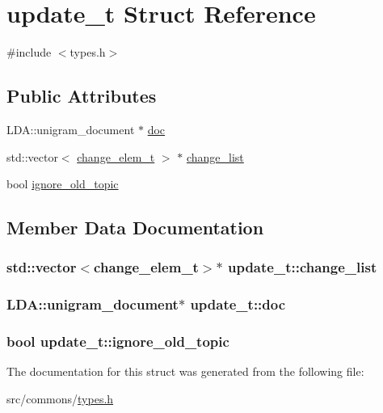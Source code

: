 \hypertarget{structupdate__t}{
\section{update\_\-t Struct Reference}
\label{structupdate__t}
}


{\ttfamily \#include $<$types.h$>$}

\subsection*{Public Attributes}
\begin{DoxyCompactItemize}
\item 
LDA::unigram\_\-document $\ast$ \hyperlink{structupdate__t_ac1336562dabdbe841f39315c5648c276}{doc}
\item 
std::vector$<$ \hyperlink{structchange__elem__t}{change\_\-elem\_\-t} $>$ $\ast$ \hyperlink{structupdate__t_a8504a8a8868ad80d60c41676176fa835}{change\_\-list}
\item 
bool \hyperlink{structupdate__t_a785a70cb98e29c02f8f318c32d6d88c3}{ignore\_\-old\_\-topic}
\end{DoxyCompactItemize}


\subsection{Member Data Documentation}
\hypertarget{structupdate__t_a8504a8a8868ad80d60c41676176fa835}{
\subsubsection[{change\_\-list}]{\setlength{\rightskip}{0pt plus 5cm}std::vector$<${\bf change\_\-elem\_\-t}$>$$\ast$ {\bf update\_\-t::change\_\-list}}}
\label{structupdate__t_a8504a8a8868ad80d60c41676176fa835}
\hypertarget{structupdate__t_ac1336562dabdbe841f39315c5648c276}{
\subsubsection[{doc}]{\setlength{\rightskip}{0pt plus 5cm}LDA::unigram\_\-document$\ast$ {\bf update\_\-t::doc}}}
\label{structupdate__t_ac1336562dabdbe841f39315c5648c276}
\hypertarget{structupdate__t_a785a70cb98e29c02f8f318c32d6d88c3}{
\subsubsection[{ignore\_\-old\_\-topic}]{\setlength{\rightskip}{0pt plus 5cm}bool {\bf update\_\-t::ignore\_\-old\_\-topic}}}
\label{structupdate__t_a785a70cb98e29c02f8f318c32d6d88c3}


The documentation for this struct was generated from the following file:\begin{DoxyCompactItemize}
\item 
src/commons/\hyperlink{types_8h}{types.h}\end{DoxyCompactItemize}
